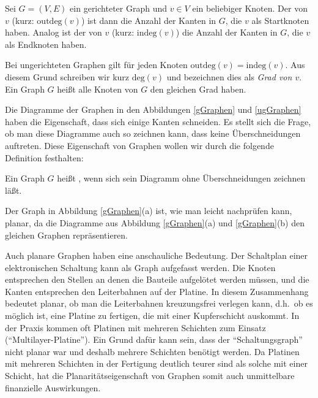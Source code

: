 \begin{definition}
Sei $G = (V,E)$ ein gerichteter Graph und $v \in V$ ein beliebiger
Knoten. Der  von $v$ (kurz:
$\mathrm{outdeg}(v)$) ist dann 
die Anzahl der Kanten in $G$, die $v$ als Startknoten haben. Analog 
ist der  von $v$ 
(kurz: $\mathrm{indeg}(v)$) die 
Anzahl der Kanten in $G$, die $v$ als Endknoten haben.

Bei ungerichteten Graphen gilt für jeden Knoten
$\mathrm{outdeg}(v)=\mathrm{indeg}(v)$. Aus diesem Grund schreiben wir
kurz $\mathrm{deg}(v)$ und bezeichnen dies als \emph{Grad von
$v$}. 
Ein Graph $G$ heißt  \gdw alle
Knoten von $G$ den gleichen Grad haben.
\end{definition}
Die Diagramme der Graphen in den Abbildungen \ref{gGraphen}
und \ref{ugGraphen} haben die Eigenschaft, dass sich einige Kanten
schneiden. Es stellt sich die Frage, ob man diese Diagramme auch so
zeichnen kann, dass keine Überschneidungen auftreten. Diese
Eigenschaft von Graphen wollen wir durch die folgende Definition
festhalten:
\begin{definition}
Ein Graph $G$ heißt , wenn sich sein Diagramm ohne
Überschneidungen zeichnen läßt.
\end{definition}

\begin{example}
Der Graph in Abbildung \ref{gGraphen}(a) ist, wie man leicht
nachprüfen kann, planar, da die Diagramme aus
Abbildung \ref{gGraphen}(a) und \ref{gGraphen}(b) den gleichen Graphen
repräsentieren.
\end{example}
Auch planare Graphen haben eine anschauliche Bedeutung. Der Schaltplan
einer elektronischen Schaltung kann als Graph aufgefasst werden. Die
Knoten entsprechen den Stellen an denen die Bauteile aufgelötet werden
müssen, und die Kanten entsprechen den Leiterbahnen auf der
Platine. In diesem Zusammenhang bedeutet planar, ob man die
Leiterbahnen kreuzungsfrei verlegen kann, d.h.~ob es möglich ist, eine
Platine zu fertigen, die mit einer Kupferschicht auskommt. In der
Praxis kommen oft Platinen mit mehreren Schichten zum Einsatz
("`Multilayer-Platine"'). Ein Grund dafür kann sein, dass der
"`Schaltungsgraph"' nicht planar war und deshalb mehrere Schichten
benötigt werden. Da Platinen mit mehreren Schichten in der Fertigung
deutlich teurer sind als solche mit einer Schicht, hat die
Planaritätseigenschaft von Graphen somit auch unmittelbare finanzielle
Auswirkungen.

